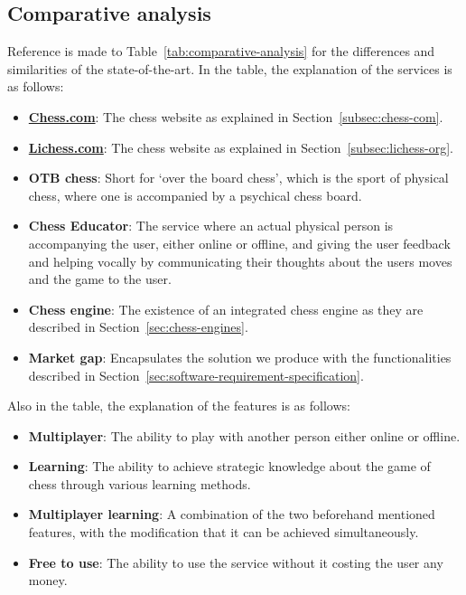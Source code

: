 \subsection{Comparative analysis}\label{subsec:comparative-analysis}

Reference is made to Table~\ref{tab:comparative-analysis} for the differences and similarities of the state-of-the-art.
In the table, the explanation of the services is as follows:

\begin{itemize}
    \item \textbf{\url{Chess.com}}: The chess website as explained in Section~\ref{subsec:chess-com}.
    \item \textbf{\url{Lichess.com}}: The chess website as explained in Section~\ref{subsec:lichess-org}.
    \item \textbf{OTB chess}: Short for `over the board chess',
    which is the sport of physical chess, where one is accompanied by a psychical chess board.
    \item \textbf{Chess Educator}: The service where an actual physical person is accompanying the user, either online
    or offline, and giving the user feedback and helping vocally by communicating their thoughts about the users moves
    and the game to the user.
    \item \textbf{Chess engine}: The existence of an integrated chess engine as they are described in
    Section~\ref{sec:chess-engines}.
    \item \textbf{Market gap}: Encapsulates the solution we produce with the functionalities described in
    Section~\ref{sec:software-requirement-specification}.
\end{itemize}

Also in the table, the explanation of the features is as follows:

\begin{itemize}
    \item \textbf{Multiplayer}: The ability to play with another person either online or offline.
    \item \textbf{Learning}: The ability to achieve strategic knowledge about the game of chess through various learning
    methods.
    \item \textbf{Multiplayer learning}: A combination of the two beforehand mentioned features, with the modification
    that it can be achieved simultaneously.
    \item \textbf{Free to use}: The ability to use the service without it costing the user any money.
\end{itemize}

